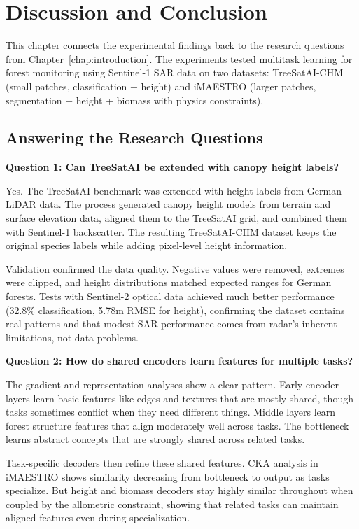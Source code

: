 \chapter{Discussion and Conclusion}
\label{chap:discussion}

This chapter connects the experimental findings back to the research questions from Chapter~\ref{chap:introduction}. The experiments tested multitask learning for forest monitoring using Sentinel-1 SAR data on two datasets: TreeSatAI-CHM (small patches, classification + height) and iMAESTRO (larger patches, segmentation + height + biomass with physics constraints).

\section{Answering the Research Questions}

\textbf{Question 1: Can TreeSatAI be extended with canopy height labels?}

Yes. The TreeSatAI benchmark was extended with height labels from German LiDAR data. The process generated canopy height models from terrain and surface elevation data, aligned them to the TreeSatAI grid, and combined them with Sentinel-1 backscatter. The resulting TreeSatAI-CHM dataset keeps the original species labels while adding pixel-level height information.

Validation confirmed the data quality. Negative values were removed, extremes were clipped, and height distributions matched expected ranges for German forests. Tests with Sentinel-2 optical data achieved much better performance (32.8\% classification, 5.78m RMSE for height), confirming the dataset contains real patterns and that modest SAR performance comes from radar's inherent limitations, not data problems.

\textbf{Question 2: How do shared encoders learn features for multiple tasks?}

The gradient and representation analyses show a clear pattern. Early encoder layers learn basic features like edges and textures that are mostly shared, though tasks sometimes conflict when they need different things. Middle layers learn forest structure features that align moderately well across tasks. The bottleneck learns abstract concepts that are strongly shared across related tasks.

Task-specific decoders then refine these shared features. CKA analysis in iMAESTRO shows similarity decreasing from bottleneck to output as tasks specialize. But height and biomass decoders stay highly similar throughout when coupled by the allometric constraint, showing that related tasks can maintain aligned features even during specialization.

